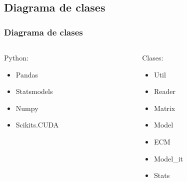 \documentclass{beamer}
\begin{document}
        \subsection{Diagrama de clases}
            \begin{frame}
            \frametitle{Diagrama de clases}
            \begin{columns}[T]
            \begin{column}{.48\textwidth}
            Python:
            \begin{itemize}
            \item Pandas
            \item Statsmodels
            \item Numpy
            \item Scikits.CUDA
            \end{itemize}
            \end{column}%

            \begin{column}{.48\textwidth}
            Clases:
            \begin{itemize}
             \item Util
             \item Reader
             \item Matrix
             \item Model
             \item ECM
             \item Model\_it
             \item Stats
            \end{itemize}
            \end{column}%
            \end{columns}
            \end{frame}
\end{document}

